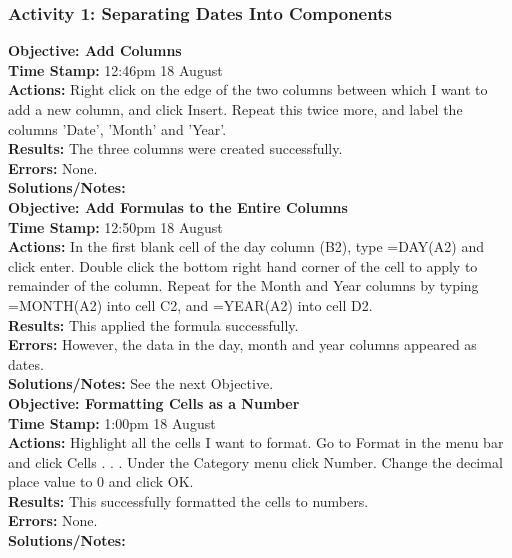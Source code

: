 \documentclass{article}
\begin{document}
\begin{FlushLeft}
\subsubsection*{Activity 1: Separating Dates Into Components}
\textbf{Objective: Add Columns}\\
\textbf{Time Stamp:} 12:46pm 18 August \\
\textbf{Actions:} Right click on the edge of the two columns between which I want to add a new column, and click Insert. Repeat this twice more, and label the columns 'Date', 'Month' and 'Year'.\\
\textbf{Results:} The three columns were created successfully.\\
\textbf{Errors:} None. \\
\textbf{Solutions/Notes:}\\
\vspace{5mm}
\textbf{Objective: Add Formulas to the Entire Columns}\label{sec:cellformat}\\
\textbf{Time Stamp:} 12:50pm 18 August \\
\textbf{Actions:} In the first blank cell of the day column (B2), type =DAY(A2) and click enter. Double click the bottom right hand corner of the cell to apply to remainder of the column. Repeat for the Month and Year columns by typing =MONTH(A2) into cell C2, and =YEAR(A2) into cell D2.\\
\textbf{Results:} This applied the formula successfully. \\
\textbf{Errors:} However, the data in the day, month and year columns appeared as dates. \\
\textbf{Solutions/Notes:} See the next Objective.\\
\vspace{5mm}
\textbf{Objective: Formatting Cells as a Number}\\
\textbf{Time Stamp:} 1:00pm 18 August \\
\textbf{Actions:} Highlight all the cells I want to format. Go to Format in the menu bar and click Cells . . . Under the Category menu click Number. Change the decimal place value to 0 and click OK.\\
\textbf{Results:} This successfully formatted the cells to numbers.\\
\textbf{Errors:} None.\\
\textbf{Solutions/Notes:}\\


\end{FlushLeft}
\end{document}
